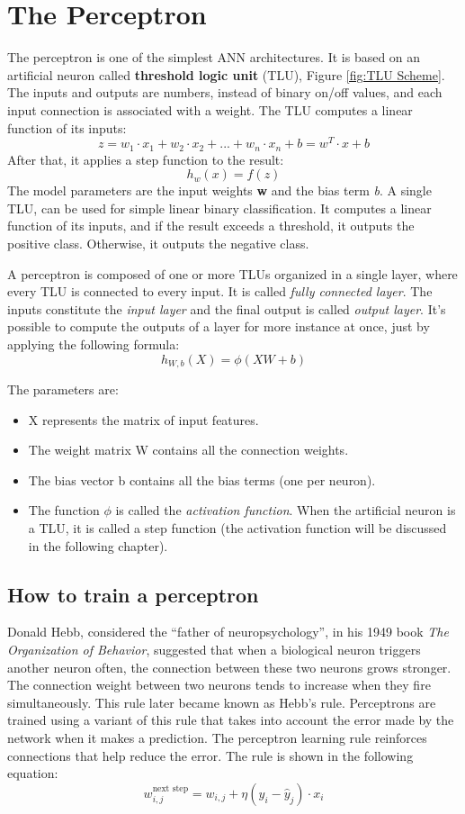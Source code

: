 \section{The Perceptron}
The perceptron is one of the simplest ANN architectures. It is based on an artificial neuron called \textbf{threshold logic unit} (TLU), Figure \ref{fig:TLU Scheme}. The inputs and outputs are numbers, instead of binary on/off values, and each input connection is associated with a weight.  
The TLU computes a linear function of its inputs: 
\[
z = w_1 \cdot x_1 + w_2 \cdot x_2 + ... + w_n \cdot x_n + b = w^T \cdot x + b
\]
After that, it applies a step function to the result: 
\[
h_w(x) = f(z)
\]
The model parameters are the input weights \textbf{w} and the bias term \textit{b}.
A single TLU, can be used for simple linear binary classification. It computes a linear function of its inputs, and if the result exceeds a threshold, it outputs the positive class. Otherwise, it outputs the negative class. 



A perceptron is composed of one or more TLUs organized in a single layer, where every TLU is connected to every input. It is called \textit{fully connected layer}. The inputs constitute the \textit{input layer} and the final output is called \textit{output layer}.
It's possible to compute the outputs of a layer for more instance at once, just by applying the following formula:
\[
h_{W,b}(X) = \phi(XW + b)
\]

The parameters are: 
\begin{itemize}
    \item X represents the matrix of input features. 
    \item The weight matrix W contains all the connection weights. 
    \item The bias vector b contains all the bias terms (one per neuron).
    \item The function $\phi$ is called the \textit{activation function}. When the artificial neuron is a TLU, it is called a step function (the activation function will be discussed in the following chapter).
\end{itemize}

\subsection{How to train a perceptron}
Donald Hebb, considered the “father of neuropsychology”, in his 1949 book \textit{The Organization of Behavior}, suggested that when a biological neuron triggers another neuron often, the connection between these two neurons grows stronger. The connection weight between two neurons tends to increase when they fire simultaneously. This rule later became known as Hebb's rule. 
Perceptrons are trained using a variant of this rule that takes into account the error made by the network when it makes a prediction. The perceptron learning rule reinforces connections that help reduce the error. 
The rule is shown in the following equation:
\[
w_{i,j}^\text{next step} = w_{i,j} + \eta(y_i - \hat{y}_j) \cdot x_i
\]


